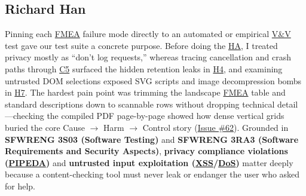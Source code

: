 \documentclass[11pt]{article}
\newcommand{\DoS}{\hyperlink{ha-acr-dos}{DoS}}
\newcommand{\FMEA}{\hyperlink{ha-acr-fmea}{FMEA}}
\newcommand{\HA}{\hyperlink{ha-acr-ha}{HA}}
\newcommand{\PIPEDA}{\hyperlink{ha-acr-pipeda}{PIPEDA}}
\newcommand{\VnV}{\hyperlink{ha-acr-vnv}{V\&V}}
\newcommand{\XSS}{\hyperlink{ha-acr-xss}{XSS}}
\begin{document}
\subsection*{Richard Han}
Pinning each \FMEA{} failure mode directly to an automated or empirical \VnV{} test gave our test suite a concrete purpose. Before doing the \HA{}, I treated privacy mostly as ``don't log requests,'' whereas tracing cancellation and crash paths through \hyperref[comp:C5]{C5} surfaced the hidden retention leaks in \hyperref[haz:H4]{H4}, and examining untrusted DOM selections exposed SVG scripts and image decompression bombs in \hyperref[haz:H7]{H7}. The hardest pain point was trimming the landscape \FMEA{} table and standard descriptions down to scannable rows without dropping technical detail—checking the compiled PDF page-by-page showed how dense vertical grids buried the core Cause $\to$ Harm $\to$ Control story (\href{https://github.com/richy1337/Verity/issues/62}{Issue \#62}). Grounded in \textbf{SFWRENG 3S03 (Software Testing)} and \textbf{SFWRENG 3RA3 (Software Requirements and Security Aspects)}, \textbf{privacy compliance violations (\PIPEDA{})} and \textbf{untrusted input exploitation (\XSS{}/\DoS{})} matter deeply because a content-checking tool must never leak or endanger the user who asked for help.
\end{document}
